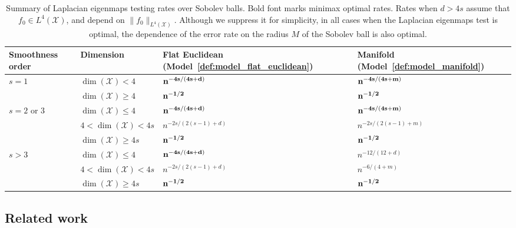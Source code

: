 \documentclass[aos]{imsart}
\theoremstyle{plain}
\theoremstyle{definition}
\theoremstyle{remark}
\newcommand{\mc}[1]{\mathcal{#1}}
\newcommand{\1}{\mathbf{1}}
\begin{document}
\begin{table}
	\begin{center}
		\begin{tabular}{p{} p{} | p{} p{} }
			Smoothness order & Dimension & Flat Euclidean (Model~\ref{def:model_flat_euclidean}) & Manifold (Model~\ref{def:model_manifold}) \\
			\hline
			\multirow{2}{*}{$s = 1$} & $\dim(\mc{X}) < 4$ & ${\bf n^{-4s/(4s + d)}}$ & ${\bf n^{-4s/(4s + m)}}$ \\
			& $\dim(\mc{X}) \geq 4$ & ${\bf n^{-1/2}}$ & ${\bf n^{-1/2}}$ \\
			\hline
			\multirow{3}{*}{$s = 2$ or $3$} & $\dim(\mc{X}) \leq 4$  & ${\bf n^{-4s/(4s + d)}}$ & ${\bf n^{-4s/(4s + m)}}$ \\
			& $4 <\dim(\mc{X}) < 4s$  & $n^{-2s/(2(s - 1) + d)}$ & $n^{-2s/(2(s - 1) + m)}$\\
			& $\dim(\mc{X}) \geq 4s$ & ${\bf n^{-1/2}}$ & ${\bf n^{-1/2}}$ \\
			\hline
			\multirow{3}{*}{$s > 3$} & $\dim(\mc{X}) \leq 4$ & ${\bf n^{-4s/(4s + d)}}$ & $n^{-12/(12 + d)}$ \\
			& $4 < \dim(\mc{X}) < 4s$ & $n^{-2s/(2(s - 1) + d)}$ & $n^{-6/(4 + m)}$ \\
			& $\dim(\mc{X}) \geq 4s$ & ${\bf n^{-1/2}}$ & ${\bf n^{-1/2}}$ \\
		\end{tabular}
	\end{center}
	\caption{Summary of Laplacian eigenmaps testing rates over Sobolev balls. Bold font marks minimax optimal rates. Rates when $d > 4s$ assume that $f_0 \in L^4(\mc{X})$, and depend on $\|f_0\|_{L^4(\mc{X})}$. Although we suppress it for simplicity, in all cases when the Laplacian eigenmaps test is optimal, the dependence of the error rate on the radius $M$ of the Sobolev ball is also optimal.}
	\label{tbl:testing_rates}
\end{table}

\subsection{Related work}
\end{document}
